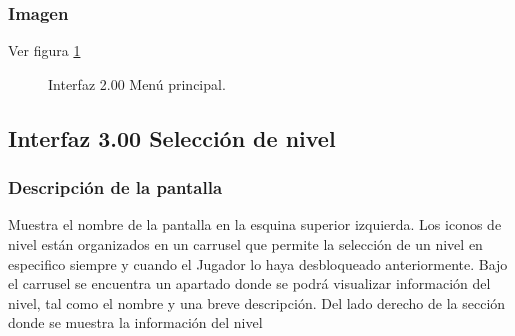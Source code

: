\documentclass[11pt,letterpaper]{article}
\begin{document}
	\subsubsection{Imagen}
Ver figura \ref{fig:PMenuP}
\begin{figure}
  \centering
   
 	
  \caption{Interfaz 2.00 Menú principal.}
  \label{fig:PMenuP}
\end{figure} 
 

\subsection{Interfaz 3.00 Selección de nivel}
	\subsubsection{Descripción de la pantalla}
Muestra el nombre de la pantalla en la esquina superior izquierda.
Los iconos de nivel están organizados en un carrusel que permite la selección de un nivel en especifico siempre y cuando el Jugador lo haya desbloqueado anteriormente.  
Bajo el carrusel se encuentra un apartado donde se podrá visualizar información del nivel, tal como el nombre y una breve descripción.
Del lado derecho de la sección donde se muestra la información del nivel 
\end{document}
